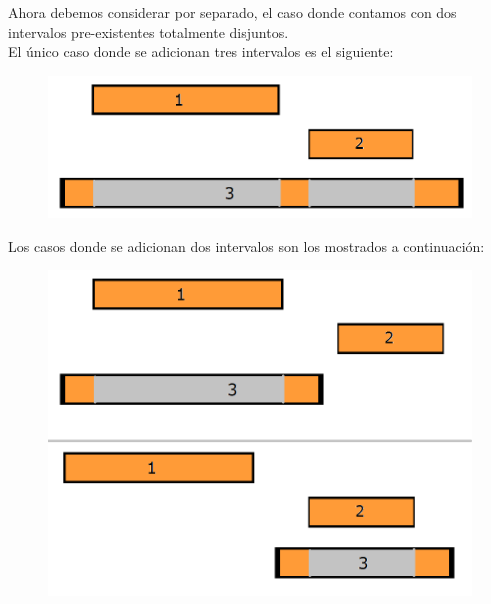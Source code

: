 Ahora debemos considerar por separado, el caso donde contamos con dos intervalos pre-existentes totalmente disjuntos.\\

El \'unico caso donde se adicionan tres intervalos es el siguiente:\\
  \begin{figure}[h!]
   \begin{center}
 	\includegraphics[scale=0.45]{imagenes/ej2/secuencias/Paso2/Caso3.png}
   \end{center}
 \end{figure}
\newpage

Los casos donde se adicionan dos intervalos son los mostrados a continuaci\'on:
  \begin{figure}[h!]
   \begin{center}
 	\includegraphics[scale=0.45]{imagenes/ej2/secuencias/Paso2/todos2.png}
   \end{center}
 \end{figure}


